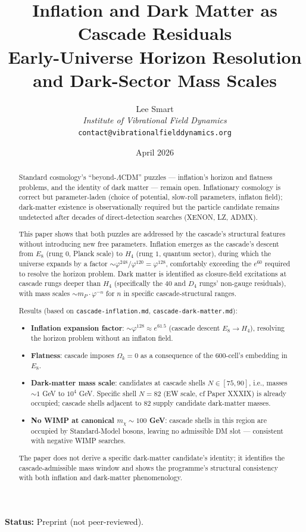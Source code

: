 \documentclass[12pt]{article}
\title{Inflation and Dark Matter as Cascade Residuals\\[6pt]
\large Early-Universe Horizon Resolution and Dark-Sector Mass Scales}
\author{Lee Smart\\ \textit{Institute of Vibrational Field Dynamics}\\ \texttt{contact@vibrationalfielddynamics.org}}
\date{April 2026}
\theoremstyle{remark}
\begin{document}
\maketitle

\noindent\textbf{Status:} Preprint (not peer-reviewed).

\begin{abstract}
Standard cosmology's ``beyond-$\Lambda$CDM'' puzzles --- inflation's horizon and flatness problems, and the identity of dark matter --- remain open. Inflationary cosmology is correct but parameter-laden (choice of potential, slow-roll parameters, inflaton field); dark-matter existence is observationally required but the particle candidate remains undetected after decades of direct-detection searches (XENON, LZ, ADMX).

This paper shows that both puzzles are addressed by the cascade's structural features without introducing new free parameters. Inflation emerges as the cascade's descent from $E_8$ (rung $0$, Planck scale) to $H_4$ (rung $1$, quantum sector), during which the universe expands by a factor $\sim \varphi^{248}/\varphi^{120} = \varphi^{128}$, comfortably exceeding the $e^{60}$ required to resolve the horizon problem. Dark matter is identified as closure-field excitations at cascade rungs deeper than $H_4$ (specifically the $40$ and $D_4$ rungs' non-gauge residuals), with mass scales $\sim m_P \cdot \varphi^{-n}$ for $n$ in specific cascade-structural ranges.

Results (based on \texttt{cascade-inflation.md}, \texttt{cascade-dark-matter.md}):
\begin{itemize}
\item \textbf{Inflation expansion factor}: $\sim \varphi^{128} \approx e^{61.5}$ (cascade descent $E_8 \to H_4$), resolving the horizon problem without an inflaton field.
\item \textbf{Flatness}: cascade imposes $\Omega_k = 0$ as a consequence of the 600-cell's embedding in $E_8$.
\item \textbf{Dark-matter mass scale}: candidates at cascade shells $N \in [75, 90]$, i.e., masses $\sim 1$ GeV to $10^4$ GeV. Specific shell $N = 82$ (EW scale, cf Paper XXXIX) is already occupied; cascade shells adjacent to $82$ supply candidate dark-matter masses.
\item \textbf{No WIMP at canonical $m_\chi \sim 100$ GeV}: cascade shells in this region are occupied by Standard-Model bosons, leaving no admissible DM slot --- consistent with negative WIMP searches.
\end{itemize}

The paper does not derive a specific dark-matter candidate's identity; it identifies the cascade-admissible mass window and shows the programme's structural consistency with both inflation and dark-matter phenomenology.
\end{abstract}
\end{document}
